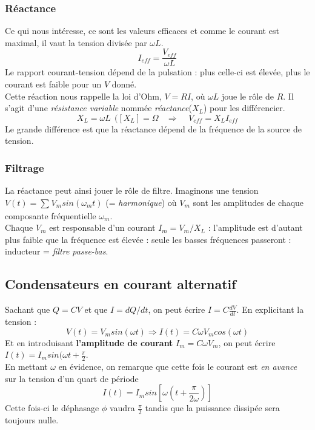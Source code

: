 \documentclass	[11pt, a4paper, openany]{book}
\begin{document}
\subsubsection{Réactance}
Ce qui nous intéresse, ce sont les valeurs efficaces et comme le courant est maximal, il vaut la tension divisée par $\omega L$.
\begin{equation}
I_{eff} = \frac{V_{eff}}{\omega L}
\end{equation}
Le rapport courant-tension dépend de la pulsation : plus celle-ci est élevée, plus le courant est faible pour un $V$ donné.\\
Cette réaction nous rappelle la loi d'Ohm, $V = RI$, où $\omega L$ joue le rôle de $R$. Il s'agit d'une \textit{résistance variable} nommée \textit{réactance}($X_L$) pour les différencier.
\begin{equation}
X_L = \omega L\ \ ([X_L] = \Omega\ \ \ \ \Rightarrow\ \ \ \ \ V_{eff} = X_LI_{eff}
\end{equation}
Le grande différence est que la réactance dépend de la fréquence de la source de tension.

\subsubsection{Filtrage}
La réactance peut ainsi jouer le rôle de filtre. Imaginons une tension $V(t) = \sum_{}^{} V_m sin(\omega_m t)$ (= \textit{harmonique}) où $V_m$ sont les amplitudes de chaque composante fréquentielle $\omega_m$.\\

Chaque $V_m$ est responsable d'un courant $I_m = V_m / X_L$ : l'amplitude est d'autant plus faible que la fréquence est élevée : seule les basses fréquences passeront : inducteur = \textit{filtre passe-bas}.

\subsection{Condensateurs en courant alternatif}
Sachant que $Q = CV$ et que $I = dQ/dt$, on peut écrire $I = C \frac{dV}{dt}$. En explicitant la tension : 
\begin{equation}
V(t) = V_m sin(\omega t) \Rightarrow I(t) = C\omega V_m cos(\omega t)
\end{equation}
Et en introduisant \textbf{l'amplitude de courant} $I_m = C\omega V_m$, on peut écrire $I(t) = I_m sin(\omega t + \frac{\pi}{2}$.\\
En mettant $\omega$ en évidence, on remarque que cette fois le courant est \textit{en avance} sur la tension d'un quart de période
\begin{equation}
I(t) = I_m sin\left[\omega (t + \frac{\pi}{2\omega})\right]
\end{equation}
Cette fois-ci le déphasage $\phi$ vaudra $\frac{\pi}{2}$ tandis que la puissance dissipée sera toujours nulle.
\end{document}
